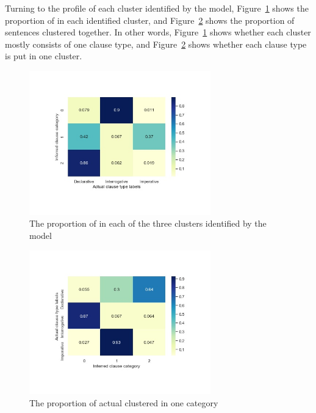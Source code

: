 Turning to the profile of each cluster identified by the \dlearnerabbr{} model, Figure~\ref{fig:baseline-heatmap} shows the proportion of \diis{} in each identified cluster, and Figure~\ref{fig:baseline-heatrev} shows the proportion of sentences clustered together. In other words, Figure~\ref{fig:baseline-heatmap} shows whether each cluster mostly consists of one clause type, and Figure~\ref{fig:baseline-heatrev} shows whether each clause type is put in one cluster.  



\begin{figure}[H]
    \centering
    \includegraphics[width=0.7\textwidth]{figures/baseline-heatmap.jpg}
    \caption{The proportion of \diis{} in each of the three clusters identified by the \dlearnerabbr{} model}
    \label{fig:baseline-heatmap}
\end{figure}


\begin{figure}[H]
    \centering
    \includegraphics[width=0.7\textwidth]{figures/baseline-heatrev.jpg}
    \caption{The proportion of actual \diis{} clustered in one category}
    \label{fig:baseline-heatrev}
\end{figure}


